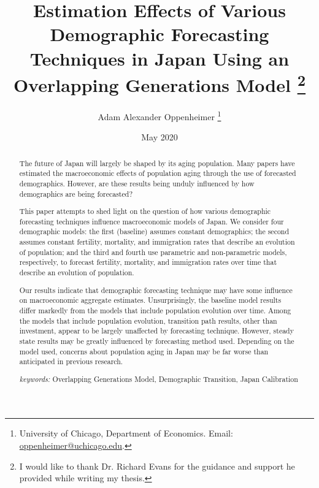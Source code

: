 \documentclass[10pt]{article}
\numberwithin{equation}{subsection}
\begin{document}
\begin{titlepage}
\title{Estimation Effects of Various Demographic Forecasting Techniques in Japan Using an Overlapping Generations Model
         \thanks{I would like to thank Dr. Richard Evans for the guidance and support he provided while writing my thesis.}
      }
\author{
   Adam Alexander Oppenheimer
   \footnote{University of Chicago,
      Department of Economics. Email:
      \href{mailto:oppenheimer@uchicago.edu}
      {oppenheimer@uchicago.edu}.
   }
}
\date{May 2020 \\
   \scriptsize{}}
\maketitle
\vspace{-9mm}
\begin{abstract}
\small{The future of Japan will largely be shaped by its aging population. Many papers have estimated the macroeconomic effects of population aging through the use of forecasted demographics. However, are these results being unduly influenced by how demographics are being forecasted?
\par This paper attempts to shed light on the question of how various demographic forecasting techniques influence macroeconomic models of Japan. We consider four demographic models: the first (baseline) assumes constant demographics; the second assumes constant fertility, mortality, and immigration rates that describe an evolution of population; and the third and fourth use parametric and non-parametric models, respectively, to forecast fertility, mortality, and immigration rates over time that describe an evolution of population.
\par Our results indicate that demographic forecasting technique may have some influence on macroeconomic aggregate estimates. Unsurprisingly, the baseline model results differ markedly from the models that include population evolution over time. Among the models that include population evolution, transition path results, other than investment, appear to be largely unaffected by forecasting technique. However, steady state results may be greatly influenced by forecasting method used. Depending on the model used, concerns about population aging in Japan may be far worse than anticipated in previous research.

\vspace{3mm}

\noindent\textit{keywords:}\:
   Overlapping Generations Model,
   Demographic Transition,
   Japan Calibration

\vspace{3mm}

}

\end{abstract}
\thispagestyle{empty}
\end{titlepage}
\end{document}
